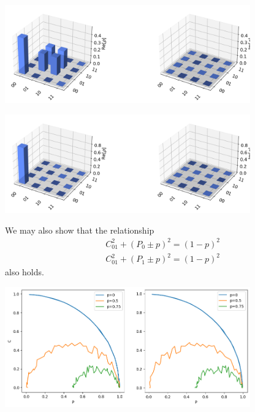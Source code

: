 \documentclass[a4paper, onecolumn]{article}
\begin{document}
		\begin{center}
			\includegraphics[width=300pt]{img/dm_p0.5_v0.png}
			\label{dm_p0.5}
		\end{center}

		\begin{center}
			\includegraphics[width=300pt]{img/dm_p1_v0.png}
			\label{dm_p1}
		\end{center}

		We may also show that the relationship \cite{yugra_constraints_2022}
		\begin{equation}	
		\begin{aligned}
		& C_{01}^2+\left(P_0 \pm p\right)^2=(1-p)^2 \\
		& C_{01}^2+\left(P_1 \pm p\right)^2=(1-p)^2
		\end{aligned}
		\label{cp_relation}
		\end{equation}
		also holds.

		\begin{center}
			\includegraphics[width=300pt]{img/c_v_p_q2_v0.png}
			\label{c_v_p_q2}
		\end{center}
	
\end{document}
